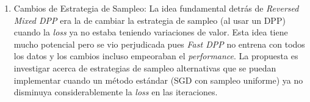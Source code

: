 \begin{enumerate}
    \item Cambios de Estrategia de Sampleo: La idea fundamental detrás de \textit{Reversed Mixed DPP} era la de cambiar la estrategia de sampleo (al usar un DPP) cuando la \textit{loss} ya no estaba teniendo variaciones de valor. Esta idea tiene mucho potencial pero se vio perjudicada pues \textit{Fast DPP} no entrena con todos los datos y los cambios incluso empeoraban el \textit{performance}. La propuesta es investigar acerca de estrategias de sampleo alternativas que se puedan implementar cuando un método estándar (SGD con sampleo uniforme) ya no disminuya considerablemente la \textit{loss} en las iteraciones.  
    
\end{enumerate}
